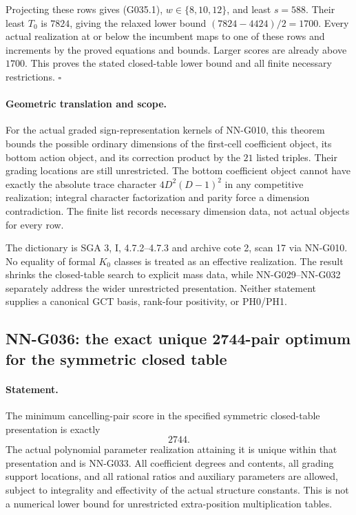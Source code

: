 Projecting these rows gives (G035.1), $w\in\{8,10,12\}$,
and least $s=588$. Their least $T_0$ is $7824$, giving
the relaxed lower bound $(7824-4424)/2=1700$.
Every actual realization at or below the incumbent
maps to one of these rows and increments by the
proved equations and bounds. Larger scores are already
above $1700$. This proves the stated closed-table
lower bound and all finite necessary restrictions.
\hfill$\square$

\paragraph{Geometric translation and scope.}
For the actual graded sign-representation kernels of
NN-G010, this theorem bounds the possible ordinary
dimensions of the first-cell coefficient object, its
bottom action object, and its correction product by
the $21$ listed triples. Their grading locations are
still unrestricted. The bottom coefficient object
cannot have exactly the absolute trace character
$4D^2(D-1)^2$ in any competitive realization; integral
character factorization and parity force a dimension
contradiction. The finite list records necessary
dimension data, not actual objects for every row.

The dictionary is SGA 3, I, 4.7.2--4.7.3 and archive
cote 2, scan 17 via NN-G010. No equality of formal
$K_0$ classes is treated as an effective realization.
The result shrinks the closed-table search to explicit
mass data, while NN-G029--NN-G032 separately address
the wider unrestricted presentation. Neither statement
supplies a canonical GCT basis, rank-four positivity,
or PH0/PH1.


\subsection{NN-G036: the exact unique 2744-pair optimum for the symmetric closed table}
\paragraph{Statement.}
The minimum cancelling-pair score in the specified symmetric
closed-table presentation is exactly
\[
                                2744.                \tag{G036.1}
\]
The actual polynomial parameter realization attaining it is
unique within that presentation and is NN-G033.
All coefficient degrees and contents, all grading support
locations, and all rational ratios and auxiliary parameters
are allowed, subject to integrality and effectivity of the
actual structure constants. This is not a numerical lower
bound for unrestricted extra-position multiplication tables.

